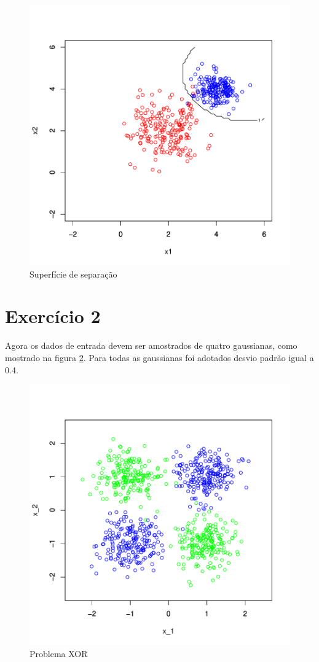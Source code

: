 \documentclass[12pt]{article}
\begin{document}
\begin{figure}
\centering
\includegraphics{BayesClassifier-008}
\caption{Superfície de separação}
\label{sup}
\end{figure}

\section{Exercício 2}
Agora os dados de entrada devem ser amostrados de quatro gaussianas, como mostrado na figura \ref{xor}. Para todas as gaussianas foi adotados desvio padrão igual a 0.4.

\begin{figure}
\centering
\includegraphics{BayesClassifier-009}
\caption{Problema XOR}
\label{xor}
\end{figure}
\end{document}
